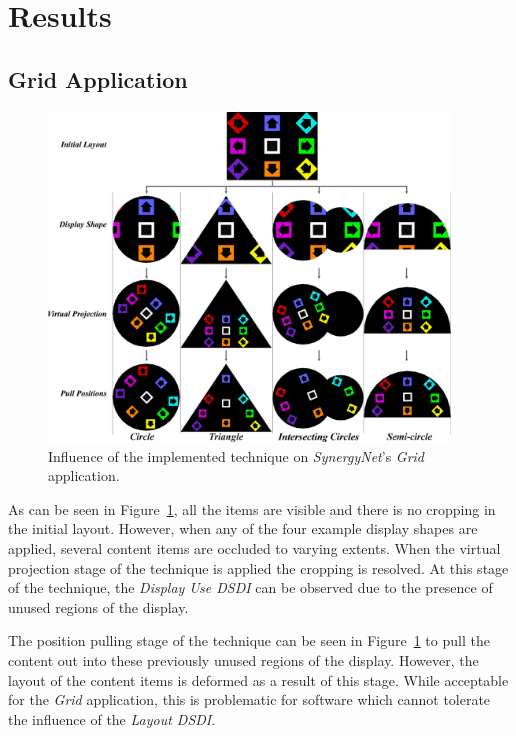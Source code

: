 \documentclass[twocolumn,compsoc]{cvm}
\begin{document}
{%
\section{Results}
\label{sec:results}




\subsection{Grid Application}
\label{subsec:gridresults} 


\begin{figure}[h!] 
 \centering
  \includegraphics[width=0.95\textwidth]{figures/GridApplication.jpeg}
  \caption{Influence of the implemented technique on {\emph{SynergyNet}}'s {\emph{Grid}} application.}
  \label{fig:gridApp}
\end{figure}

As can be seen in Figure~\ref{fig:gridApp}, all the items are visible and there is no cropping in the initial layout.
However, when any of the four example display shapes are applied, several content items are occluded to varying extents.
When the virtual projection stage of the technique is applied the cropping is resolved.
At this stage of the technique, the {\emph{Display Use \ac{DSDI}}} can be observed due to the presence of unused regions of the display.

The position pulling stage of the technique can be seen in Figure~\ref{fig:gridApp} to pull the content out into these previously unused regions of the display.
However, the layout of the content items is deformed as a result of this stage.
While acceptable for the {\emph{Grid}} application, this is problematic for software which cannot tolerate the influence of the {\emph{Layout \ac{DSDI}}}.

}
\end{document}
